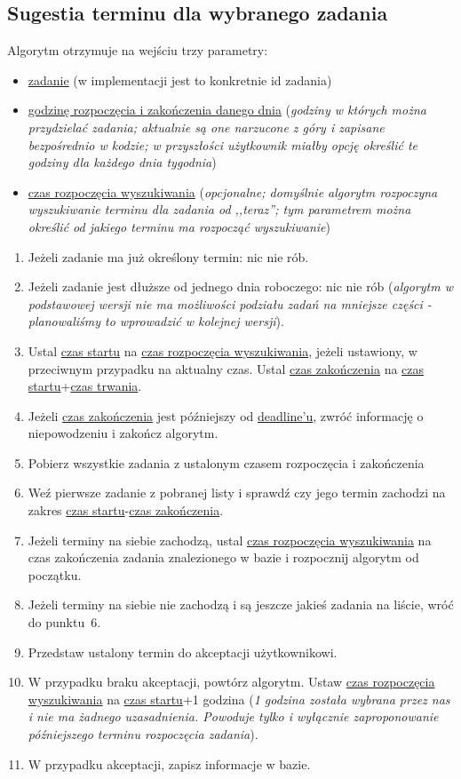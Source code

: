 \documentclass[pdflatex,11pt]{aghdpl}
\begin{document}
\subsection{Sugestia terminu dla wybranego zadania}
\label{sec:algJednoZadanie}

Algorytm otrzymuje na wejściu trzy parametry:
\begin{itemize}
\item \underline{zadanie} (w implementacji jest to konkretnie id zadania)
\item \underline{godzinę rozpoczęcia i zakończenia danego dnia} (\textit{godziny w których można przydzielać zadania; aktualnie są one narzucone z góry i zapisane bezpośrednio w kodzie; w przyszłości użytkownik miałby opcję określić te godziny dla każdego dnia tygodnia})
\item \underline{czas rozpoczęcia wyszukiwania} (\textit{opcjonalne; domyślnie algorytm rozpoczyna wyszukiwanie terminu dla zadania od ,,teraz''; tym parametrem można określić od jakiego terminu ma rozpocząć wyszukiwanie})
\end{itemize}

\begin{enumerate}
\item Jeżeli zadanie ma już określony termin: nic nie rób.
\item Jeżeli zadanie jest dłuższe od jednego dnia roboczego: nic nie rób (\textit{algorytm w podstawowej wersji nie ma możliwości podziału zadań na mniejsze części - planowaliśmy to wprowadzić w kolejnej wersji}).
\item Ustal \underline{czas startu} na \underline{czas rozpoczęcia wyszukiwania}, jeżeli ustawiony, w przeciwnym przypadku na aktualny czas. Ustal \underline{czas zakończenia} na \underline{czas startu}+\underline{czas trwania}.
\item Jeżeli \underline{czas zakończenia} jest późniejszy od \underline{deadline'u}, zwróć informację o niepowodzeniu i zakończ algorytm.
\item Pobierz wszystkie zadania z ustalonym czasem rozpoczęcia i zakończenia
\item Weź pierwsze zadanie z pobranej listy i sprawdź czy jego termin zachodzi na zakres \underline{czas startu}-\underline{czas zakończenia}.
\item Jeżeli terminy na siebie zachodzą, ustal \underline{czas rozpoczęcia wyszukiwania} na czas zakończenia zadania znalezionego w bazie i rozpocznij algorytm od początku.
\item Jeżeli terminy na siebie nie zachodzą i są jeszcze jakieś zadania na liście, wróć do punktu~6.
\item Przedstaw ustalony termin do akceptacji użytkownikowi.
\item W przypadku braku akceptacji, powtórz algorytm. Ustaw \underline{czas rozpoczęcia wyszukiwania} na \underline{czas startu}+1 godzina (\textit{1 godzina została wybrana przez nas i nie ma żadnego uzasadnienia. Powoduje tylko i wyłącznie zaproponowanie późniejszego terminu rozpoczęcia zadania}).
\item W przypadku akceptacji, zapisz informacje w bazie.
\end{enumerate}
\end{document}
